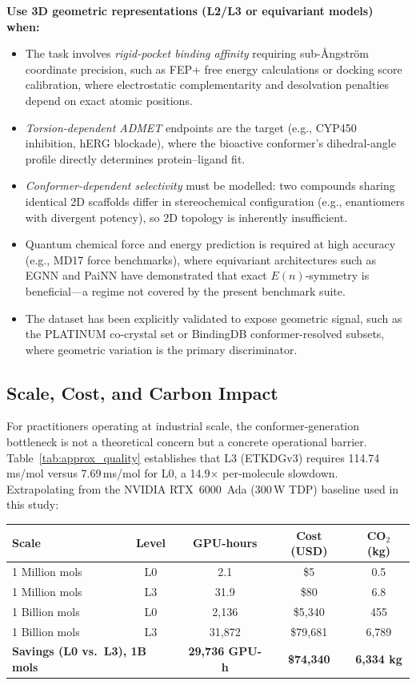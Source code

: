 \documentclass[pdflatex,sn-vancouver-num]{sn-jnl}%
\theoremstyle{thmstyleone}%
\theoremstyle{thmstyletwo}%
\theoremstyle{thmstylethree}%
\begin{document}
\textbf{Use 3D geometric representations (L2/L3 or equivariant models) when:}
\begin{itemize}
  \item The task involves \emph{rigid-pocket binding affinity} requiring sub-\AA{}ngstr\"{o}m coordinate precision, such as FEP+ free energy calculations or docking score calibration, where electrostatic complementarity and desolvation penalties depend on exact atomic positions.
  \item \emph{Torsion-dependent ADMET} endpoints are the target (e.g., CYP450 inhibition, hERG blockade), where the bioactive conformer's dihedral-angle profile directly determines protein--ligand fit.
  \item \emph{Conformer-dependent selectivity} must be modelled: two compounds sharing identical 2D scaffolds differ in stereochemical configuration (e.g., enantiomers with divergent potency), so 2D topology is inherently insufficient.
  \item Quantum chemical force and energy prediction is required at high accuracy (e.g., MD17 force benchmarks), where equivariant architectures such as EGNN and PaiNN have demonstrated that exact $E(n)$-symmetry is beneficial---a regime not covered by the present benchmark suite.
  \item The dataset has been explicitly validated to expose geometric signal, such as the PLATINUM co-crystal set or BindingDB conformer-resolved subsets, where geometric variation is the primary discriminator.
\end{itemize}

\subsection{Scale, Cost, and Carbon Impact}
\label{ssec:scale}

For practitioners operating at industrial scale, the conformer-generation bottleneck is not a theoretical concern but a concrete operational barrier.  Table~\ref{tab:approx_quality} establishes that L3 (ETKDGv3) requires 114.74\,ms/mol versus 7.69\,ms/mol for L0, a 14.9$\times$ per-molecule slowdown.  Extrapolating from the NVIDIA RTX~6000~Ada (300\,W TDP) baseline used in this study:

\begin{center}
\renewcommand{\arraystretch}{1.3}
\begin{tabular}{|l|c|c|c|c|}
\hline
\textbf{Scale} & \textbf{Level} & \textbf{GPU-hours} & \textbf{Cost (USD)} & \textbf{CO$_2$ (kg)} \\
\hline
1 Million mols & L0 & 2.1 & \$5 & 0.5 \\
1 Million mols & L3 & 31.9 & \$80 & 6.8 \\
\hline
1 Billion mols & L0 & 2,136 & \$5,340 & 455 \\
1 Billion mols & L3 & 31,872 & \$79,681 & 6,789 \\
\hline
\multicolumn{2}{|l|}{\textbf{Savings (L0 vs.\ L3), 1B mols}} & \textbf{29,736 GPU-h} & \textbf{\$74,340} & \textbf{6,334 kg} \\
\hline
\end{tabular}
\end{center}
\end{document}
